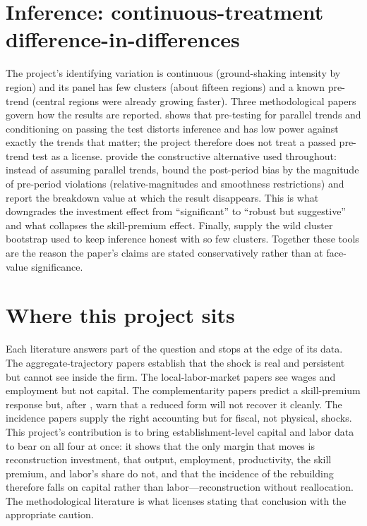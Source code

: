 \documentclass[12pt]{article}
\begin{document}
\section{Inference: continuous-treatment difference-in-differences}

The project's identifying variation is continuous (ground-shaking intensity by region) and its
panel has few clusters (about fifteen regions) and a known pre-trend (central regions were
already growing faster). Three methodological papers govern how the results are reported.
\citet{roth2022} shows that pre-testing for parallel trends and conditioning on passing the test
distorts inference and has low power against exactly the trends that matter; the project therefore
does not treat a passed pre-trend test as a license. \citet{rambachanroth2023} provide the
constructive alternative used throughout: instead of assuming parallel trends, bound the
post-period bias by the magnitude of pre-period violations (relative-magnitudes and smoothness
restrictions) and report the breakdown value at which the result disappears. This is what
downgrades the investment effect from ``significant'' to ``robust but suggestive'' and what
collapses the skill-premium effect. Finally, \citet{cameron2008} supply the wild cluster
bootstrap used to keep inference honest with so few clusters. Together these tools are the reason
the paper's claims are stated conservatively rather than at face-value significance.

\section{Where this project sits}

Each literature answers part of the question and stops at the edge of its data. The
aggregate-trajectory papers establish that the shock is real and persistent but cannot see inside
the firm. The local-labor-market papers see wages and employment but not capital. The
complementarity papers predict a skill-premium response but, after \citet{lewis2011}, warn that a
reduced form will not recover it cleanly. The incidence papers supply the right accounting but
for fiscal, not physical, shocks. This project's contribution is to bring establishment-level
capital and labor data to bear on all four at once: it shows that the only margin that moves is
reconstruction investment, that output, employment, productivity, the skill premium, and labor's
share do not, and that the incidence of the rebuilding therefore falls on capital rather than
labor---reconstruction without reallocation. The methodological literature is what licenses
stating that conclusion with the appropriate caution.
\end{document}
